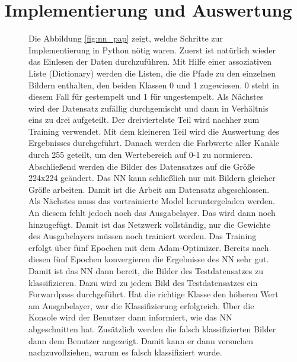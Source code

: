 \documentclass[12pt,toc=bib,toc=listof]{scrreprt}
\begin{document}
\section{Implementierung und Auswertung}
\label{sec_nn:impl}

\begin{figure}[h]
\begin{minipage}[t]{.71\linewidth}

Die Abbildung \ref{fig:nn_pap} zeigt, welche Schritte zur Implementierung in Python nötig waren. Zuerst ist natürlich wieder das Einlesen der Daten durchzuführen. Mit Hilfe einer assoziativen Liste (Dictionary) werden die Listen, die die Pfade zu den einzelnen Bildern enthalten, den beiden Klassen 0 und 1 zugewiesen. 0 steht in diesem Fall für gestempelt und 1 für ungestempelt. Als Nächstes wird der Datensatz zufällig durchgemischt und dann in Verhältnis eins zu drei aufgeteilt. Der dreiviertelste Teil wird nachher zum Training verwendet. Mit dem kleineren Teil wird die Auswertung des Ergebnisses durchgeführt. Danach werden die Farbwerte aller Kanäle durch 255 geteilt, um den Wertebereich auf 0-1 zu normieren. Abschließend werden die Bilder des Datensatzes auf die Größe 224x224 geändert. Das NN kann schließlich nur mit Bildern gleicher Größe arbeiten. Damit ist die Arbeit am Datensatz abgeschlossen. Als Nächstes muss das vortrainierte Model heruntergeladen werden. An diesem fehlt jedoch noch das Ausgabelayer. Das wird dann noch hinzugefügt. Damit ist das Netzwerk vollständig, nur die Gewichte des Ausgabelayers müssen noch trainiert werden. Das Training erfolgt über fünf Epochen mit dem Adam-Optimizer. Bereits nach diesen fünf Epochen konvergieren die Ergebnisse des NN sehr gut. Damit ist das NN dann bereit, die Bilder des Testdatensatzes zu klassifizieren. Dazu wird zu jedem Bild des Testdatensatzes ein Forwardpass durchgeführt. Hat die richtige Klasse den höheren Wert am Ausgabelayer, war die Klassifizierung erfolgreich. Über die Konsole wird der Benutzer dann informiert, wie das NN abgeschnitten hat. Zusätzlich werden die falsch klassifizierten Bilder dann dem Benutzer angezeigt. Damit kann er dann versuchen nachzuvollziehen, warum es falsch klassifiziert wurde.
\end{minipage}
\hfill
\begin{minipage}[t]{.24\linewidth}
\strut\vspace*{-\baselineskip}
\newline

\end{minipage}
\end{figure}
\end{document}
